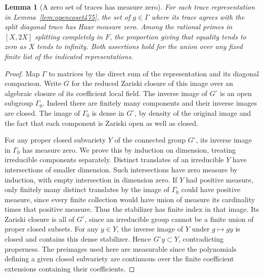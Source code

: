 \documentclass[a4paper,11pt]{article}
\newtheorem{lemma}[proposition]{Lemma}
\theoremstyle{definition}
\theoremstyle{remark}
\numberwithin{equation}{section}
\begin{document}
\begin{lemma}[A zero set of traces has measure zero]\leavevmode
\label{lem:tracezero484}
For each trace representation in Lemma~\ref{lem:opencoset475},
the set of \(g\in\Gamma\) where its trace agrees with the split
diagonal trace has Haar measure zero. Among the rational primes
in \([X,2X]\) splitting completely in \(F\), the proportion
giving that equality tends to zero as \(X\) tends to infinity.
Both assertions hold for the union over any fixed finite list
of the indicated representations.
\end{lemma}
\begin{proof}
Map \(\Gamma\) to matrices by the direct sum of the representation
and its diagonal comparison. Write \(G\) for the reduced Zariski
closure of this image over an algebraic closure of its coefficient
local field. The inverse image of \(G^\circ\) is an open subgroup
\(\Gamma_0\). Indeed there are finitely many components and their
inverse images are closed. The image of \(\Gamma_0\) is dense
in \(G^\circ\), by density of the original image and the fact that
each component is Zariski open as well as closed.

For any proper closed subvariety \(Y\) of the connected group
\(G^\circ\), its inverse image in \(\Gamma_0\) has measure zero.
We prove this by induction on dimension, treating irreducible
components separately. Distinct translates of an irreducible
\(Y\) have intersections of smaller dimension. Such intersections
have zero measure by induction, with empty intersection in
dimension zero. If \(Y\) had positive measure, only finitely
many distinct translates by the image of \(\Gamma_0\) could have
positive measure, since every finite collection would have union
of measure its cardinality times that positive measure. Thus the
stabilizer has finite index in that image. Its Zariski closure
is all of \(G^\circ\), since an irreducible group cannot be a
finite union of proper closed subsets. For any \(y\in Y\), the
inverse image of \(Y\) under \(g\mapsto gy\) is closed and
contains this dense stabilizer. Hence \(G^\circ y\subset Y\),
contradicting properness. The preimages used here are measurable
since the polynomials defining a given closed subvariety are
continuous over the finite coefficient extensions containing
their coefficients.


\end{proof}
\end{document}
